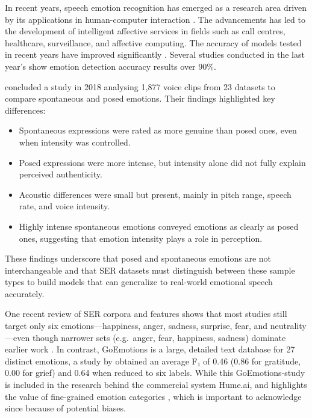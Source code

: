 In recent years, speech emotion recognition has emerged as a research area driven by its applications in human-computer interaction \autocite{Zhang2021}. The advancements has led to the development of intelligent affective services in fields such as call centres, healthcare, surveillance, and affective computing. The accuracy of models tested in recent years have improved significantly \autocite{Adebiyi2024, Praseetha2022, Rahman2024}.  Several studies conducted in the last year’s show emotion detection accuracy results over 90\%. 

\textcite{Juslin2018} concluded a study in 2018 analysing 1,877 voice clips from 23 datasets to compare spontaneous and posed emotions. Their findings highlighted key differences: 
\begin{itemize}
    \item Spontaneous expressions were rated as more genuine than posed ones, even when intensity was controlled. 
    \item Posed expressions were more intense, but intensity alone did not fully explain perceived authenticity. 
    \item Acoustic differences were small but present, mainly in pitch range, speech rate, and voice intensity. 
    \item Highly intense spontaneous emotions conveyed emotions as clearly as posed ones, suggesting that emotion intensity plays a role in perception. 
\end{itemize}
These findings underscore that posed and spontaneous emotions are not interchangeable and that SER datasets must distinguish between these sample types to build models that can generalize to real-world emotional speech accurately.  

One recent review of SER corpora and features \autocite{Rathi2024} shows that most studies still target only six emotions—happiness, anger, sadness, surprise, fear, and neutrality—even though narrower sets (e.g.\ anger, fear, happiness, sadness) dominate earlier work \autocite{Scherer2018}. In contrast, GoEmotions is a large, detailed text database for 27 distinct emotions, a study by \textcite{Demszky2020} obtained an average F₁ of 0.46 (0.86 for gratitude, 0.00 for grief) and 0.64 when reduced to six labels. While this GoEmotions-study is included in the research behind the commercial system Hume.ai, and highlights the value of fine-grained emotion categories \autocite{HumeAI-AboutHume}, which is important to acknowledge since because of potential biases.  

